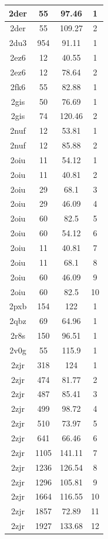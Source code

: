 \begin{center}
\begin{longtable}{c|c|c|c}
2der & 55 & 97.46 & 1 \\ \hline
2der & 55 & 109.27 & 2 \\ \hline
2du3 & 954 & 91.11 & 1 \\ \hline
2ez6 & 12 & 40.55 & 1 \\ \hline
2ez6 & 12 & 78.64 & 2 \\ \hline
2fk6 & 55 & 82.88 & 1 \\ \hline
2gis & 50 & 76.69 & 1 \\ \hline
2gis & 74 & 120.46 & 2 \\ \hline
2nuf & 12 & 53.81 & 1 \\ \hline
2nuf & 12 & 85.88 & 2 \\ \hline
2oiu & 11 & 54.12 & 1 \\ \hline
2oiu & 11 & 40.81 & 2 \\ \hline
2oiu & 29 & 68.1 & 3 \\ \hline
2oiu & 29 & 46.09 & 4 \\ \hline
2oiu & 60 & 82.5 & 5 \\ \hline
2oiu & 60 & 54.12 & 6 \\ \hline
2oiu & 11 & 40.81 & 7 \\ \hline
2oiu & 11 & 68.1 & 8 \\ \hline
2oiu & 60 & 46.09 & 9 \\ \hline
2oiu & 60 & 82.5 & 10 \\ \hline
2pxb & 154 & 122 & 1 \\ \hline
2qbz & 69 & 64.96 & 1 \\ \hline
2r8s & 150 & 96.51 & 1 \\ \hline
2v0g & 55 & 115.9 & 1 \\ \hline
2zjr & 318 & 124 & 1 \\ \hline
2zjr & 474 & 81.77 & 2 \\ \hline
2zjr & 487 & 85.41 & 3 \\ \hline
2zjr & 499 & 98.72 & 4 \\ \hline
2zjr & 510 & 73.97 & 5 \\ \hline
2zjr & 641 & 66.46 & 6 \\ \hline
2zjr & 1105 & 141.11 & 7 \\ \hline
2zjr & 1236 & 126.54 & 8 \\ \hline
2zjr & 1296 & 105.81 & 9 \\ \hline
2zjr & 1664 & 116.55 & 10 \\ \hline
2zjr & 1857 & 72.89 & 11 \\ \hline
2zjr & 1927 & 133.68 & 12 \\ \hline

\end{longtable}
\end{center}
